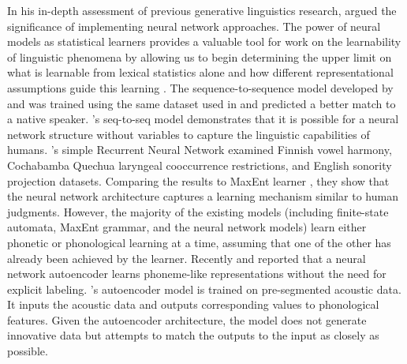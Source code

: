 \documentclass{Interspeech2024}
\begin{document}
In his in-depth assessment of previous generative linguistics research, \cite{pater_generative_2019} argued the significance of implementing neural network approaches. The power of neural models as statistical learners provides a valuable tool for work on the learnability of linguistic phenomena by allowing us to begin determining the upper limit on what is learnable from lexical statistics alone and how different representational assumptions guide this learning \cite{mayer_phonotactic_2020}. The sequence-to-sequence model developed by \cite{kirov_recurrent_2017} and \cite{kirov_recurrent_2018} was trained using the same dataset used in \cite{albright_rules_2003} and predicted a better match to a native speaker. \cite{prickett_learning_2022}'s seq-to-seq model demonstrates that it is possible for a neural network structure without variables to capture the linguistic capabilities of humans. \cite{mayer_phonotactic_2020}'s simple Recurrent Neural Network examined Finnish vowel harmony, Cochabamba Quechua laryngeal cooccurrence restrictions, and English sonority projection datasets. Comparing the results to MaxEnt learner \cite{hayes_maximum_2008}, they show that the neural network architecture captures a learning mechanism similar to human judgments. However, the majority of the existing models (including finite-state automata, MaxEnt grammar, and the neural network models) learn either phonetic or phonological learning at a time, assuming that one of the other has already been achieved by the learner\cite{martin_learning_2013,dupoux_cognitive_2018}. Recently \cite{rasanen_analyzing_2016} and \cite{shain_measuring_2019} reported that a neural network autoencoder learns phoneme-like representations without the need for explicit labeling. \cite{shain_measuring_2019}'s autoencoder model is trained on pre-segmented acoustic data. It inputs the acoustic data and outputs corresponding values to phonological features. Given the autoencoder architecture, the model does not generate innovative data but attempts to match the outputs to the input as closely as possible. 
\end{document}
